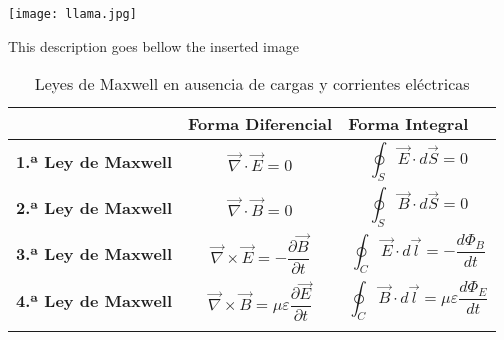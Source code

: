
\begin{figuraenv}
\texttt{[image: llama.jpg]}
\caption[This label goes to the TOC]{This description goes bellow the inserted image}\label{label to reference the image into text}
\end{figuraenv}

\begin{longtable}{| r | p{4cm} | p{4cm} |}
  \hline
  \cellcolor{lightgray}\textbf{} & \cellcolor{lightgray}\textbf{Forma Diferencial} & \cellcolor{lightgray}\textbf{Forma Integral} \\
  \hline
  \endhead
  \cellcolor{lightgray}\textbf{1.ª Ley de Maxwell} & 
  \begin{equation}
    \vec{\nabla}\cdot\vec{E} = 0
  \end{equation} &
  \begin{equation}
    \oint_{S} \vec{E} \cdot d\vec{S} = 0
  \end{equation} \\
  \hline
  \cellcolor{lightgray}\textbf{2.ª Ley de Maxwell} & 
  \begin{equation}
    \vec{\nabla}\cdot\vec{B} = 0
  \end{equation} &
  \begin{equation}
    \oint_{S} \vec{B} \cdot d\vec{S} = 0
  \end{equation} \\
  \hline
  \cellcolor{lightgray}\textbf{3.ª Ley de Maxwell} & 
  \begin{equation}
    \vec{\nabla}\times\vec{E} = -\dfrac{\partial \vec{B}}{\partial t}
  \end{equation} &
  \begin{equation}
    \oint_{C} \vec{E} \cdot d\vec{l} = - \dfrac{d\Phi_{B}}{dt}
  \end{equation} \\
  \hline
  \cellcolor{lightgray}\textbf{4.ª Ley de Maxwell} & 
  \begin{equation}
    \vec{\nabla}\times\vec{B} = \mu\varepsilon \dfrac{\partial \vec{E}}{\partial t}
  \end{equation} &
  \begin{equation}
    \oint_{C} \vec{B} \cdot d\vec{l} = \mu\varepsilon \dfrac{d\Phi_{E}}{dt}
  \end{equation} \\
  \hline
  \caption[Leyes de Maxwell en ausencia de cargas y corrientes eleéctricas]{Leyes de Maxwell en ausencia de cargas y corrientes eléctricas}\label{tab:MaxwellsLaws}
\end{longtable}


